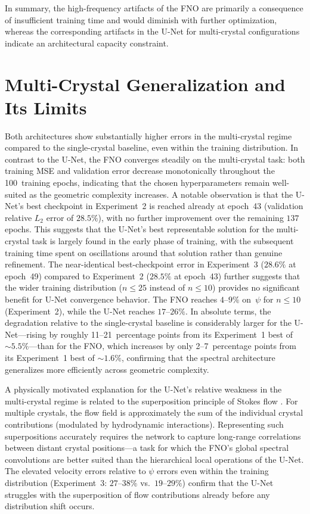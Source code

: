 In summary, the high-frequency artifacts of the FNO are primarily a consequence of insufficient training time and would diminish with further optimization, whereas the corresponding artifacts in the U-Net for multi-crystal configurations indicate an architectural capacity constraint.

\section{Multi-Crystal Generalization and Its Limits}

Both architectures show substantially higher errors in the multi-crystal regime compared to the single-crystal baseline, even within the training distribution. In contrast to the U-Net, the FNO converges steadily on the multi-crystal task: both training MSE and validation error decrease monotonically throughout the 100~training epochs, indicating that the chosen hyperparameters remain well-suited as the geometric complexity increases. A notable observation is that the U-Net's best checkpoint in Experiment~2 is reached already at epoch~43 (validation relative $L_2$ error of $28.5\%$), with no further improvement over the remaining $137$ epochs. This suggests that the U-Net's best representable solution for the multi-crystal task is largely found in the early phase of training, with the subsequent training time spent on oscillations around that solution rather than genuine refinement. The near-identical best-checkpoint error in Experiment~3 ($28.6\%$ at epoch~49) compared to Experiment~2 ($28.5\%$ at epoch~43) further suggests that the wider training distribution ($n \leq 25$ instead of $n \leq 10$) provides no significant benefit for U-Net convergence behavior. The FNO reaches $4$--$9\%$ on~$\psi$ for $n \leq 10$ (Experiment~2), while the U-Net reaches $17$--$26\%$. In absolute terms, the degradation relative to the single-crystal baseline is considerably larger for the U-Net—rising by roughly 11--21~percentage points from its Experiment~1 best of ${\sim}5.5\%$—than for the FNO, which increases by only 2--7~percentage points from its Experiment~1 best of ${\sim}1.6\%$, confirming that the spectral architecture generalizes more efficiently across geometric complexity.

A physically motivated explanation for the U-Net's relative weakness in the multi-crystal regime is related to the superposition principle of Stokes flow \parencite{happel_low_1983}. For multiple crystals, the flow field is approximately the sum of the individual crystal contributions (modulated by hydrodynamic interactions). Representing such superpositions accurately requires the network to capture long-range correlations between distant crystal positions—a task for which the FNO's global spectral convolutions are better suited than the hierarchical local operations of the U-Net. The elevated velocity errors relative to $\psi$ errors even within the training distribution (Experiment~3: $27$–$38\%$ vs.\ $19$–$29\%$) confirm that the U-Net struggles with the superposition of flow contributions already before any distribution shift occurs.

